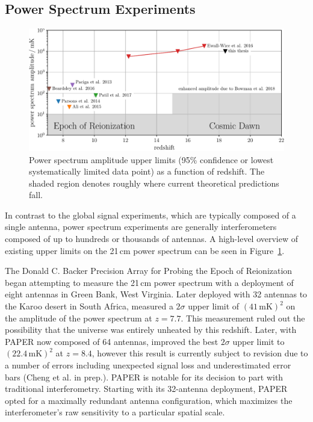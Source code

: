 \begin{bibunit}
\subsection{Power Spectrum Experiments}

\begin{figure}[t]
    \centering
    \includegraphics[width=\textwidth]{figures/chapter1/power-spectrum-upper-limits/power-spectrum-upper-limits}
    \caption{
        Power spectrum amplitude upper limits (95\% confidence or lowest systematically limited data
        point) as a function of redshift. The shaded region denotes roughly where current
        theoretical predictions fall.
    }
    \label{fig:power-spectrum-upper-limits}
\end{figure}

In contrast to the global signal experiments, which are typically composed of a single antenna,
power spectrum experiments are generally interferometers composed of up to hundreds or thousands of
antennas. A high-level overview of existing upper limits on the 21\,cm power spectrum can be seen in
Figure~\ref{fig:power-spectrum-upper-limits}.

The Donald C. Backer Precision Array for Probing the Epoch of Reionization
\citep[PAPER;][]{2010AJ....139.1468P} began attempting to measure the 21\,cm power spectrum with a
deployment of eight antennas in Green Bank, West Virginia. Later deployed with 32 antennas to the
Karoo desert in South Africa, \citet{2014ApJ...788..106P} measured a $2\sigma$ upper limit of
$(41\,\text{mK})^2$ on the amplitude of the power spectrum at $z=7.7$. This measurement ruled out
the possibility that the universe was entirely unheated by this redshift.  Later, with PAPER now
composed of 64 antennas, \citet{2015ApJ...809...61A} improved the best $2\sigma$ upper limit to
$(22.4\,\text{mK})^2$ at $z=8.4$, however this result is currently subject to revision due to a
number of errors including unexpected signal loss and underestimated error bars (Cheng et al. in
prep.). PAPER is notable for its decision to part with traditional interferometry. Starting with its
32-antenna deployment, PAPER opted for a maximally redundant antenna configuration, which maximizes
the interferometer's raw sensitivity to a particular spatial scale.


\end{bibunit}
